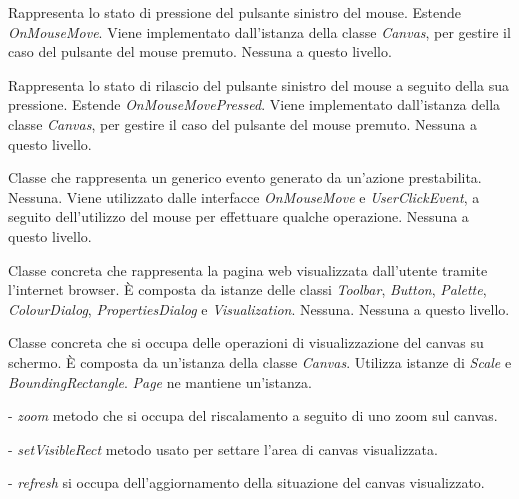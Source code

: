 Rappresenta lo stato di pressione del pulsante sinistro del mouse.
Estende \textit{OnMouseMove}.
Viene implementato dall'istanza della classe \textit{Canvas}, per gestire il caso del pulsante del mouse premuto.
Nessuna a questo livello.

Rappresenta lo stato di rilascio del pulsante sinistro del mouse a seguito della sua pressione.
Estende \textit{OnMouseMovePressed}.
Viene implementato dall'istanza della classe \textit{Canvas}, per gestire il caso del pulsante del mouse premuto.
Nessuna a questo livello.

Classe che rappresenta un generico evento generato da un'azione prestabilita.
Nessuna.
Viene utilizzato dalle interfacce \textit{OnMouseMove} e \textit{UserClickEvent}, a seguito dell'utilizzo del mouse per effettuare qualche operazione.
Nessuna a questo livello.

Classe concreta che rappresenta la pagina web visualizzata dall'utente tramite l'internet browser.
\` E composta da istanze delle classi \textit{Toolbar}, \textit{Button}, \textit{Palette}, \textit{ColourDialog}, \textit{PropertiesDialog} e \textit{Visualization}.
Nessuna.
Nessuna a questo livello.

Classe concreta che si occupa delle operazioni di visualizzazione del canvas su schermo. 
\` E composta da un'istanza della classe \textit{Canvas}. Utilizza istanze di \textit{Scale} e \textit{BoundingRectangle}.
\textit{Page} ne mantiene un'istanza.
\begin{elencopuntato}[\normindent]
\item[-]  \textit{zoom} metodo che si occupa del riscalamento a seguito di uno zoom sul canvas.
\item[-]  \textit{setVisibleRect} metodo usato per settare l'area di canvas visualizzata.
\item[-]  \textit{refresh} si occupa dell'aggiornamento della situazione del canvas visualizzato.
\end{elencopuntato}

